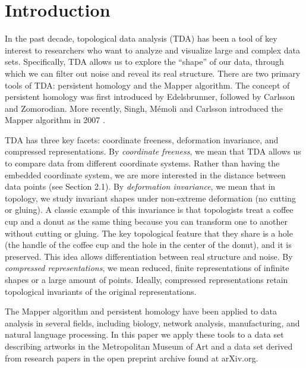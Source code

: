 \documentclass[12pt]{article}
\theoremstyle{definition}
\begin{document}
\section{Introduction}
In the past decade, topological data analysis (TDA) has been a tool of key interest to researchers who want to analyze and visualize large and complex data sets. Specifically, TDA allows us to explore the ``shape'' of our data, through which we can filter out noise and reveal its real structure. There are two primary tools of TDA: persistent homology and the Mapper algorithm. The concept of persistent homology was first introduced by Edelsbrunner\cite{Edelsbrunner2002}, followed by Carlsson and Zomorodian\cite{Zomorodian2005}. More recently, Singh, M\'emoli and Carlsson introduced the Mapper algorithm in 2007 \cite{originalmapper}.
\newline
\par TDA has three key facets: coordinate freeness, deformation invariance, and compressed representations\cite{lum2013extractinginsights}. By \textit{coordinate freeness}, we mean that TDA allows us to compare data from different coordinate systems. Rather than having the embedded coordinate system, we are more interested in the distance between data points (see Section 2.1). By \textit{deformation invariance}, we mean that in topology, we study invariant shapes under non-extreme deformation  (no cutting or gluing). A classic example of this invariance is that topologists treat a coffee cup and a donut as the same thing because you can transform one to another without cutting or gluing. The key topological feature that they share is a hole (the handle of the coffee cup and the hole in the center of the donut), and it is preserved. This idea allows differentiation between real structure and noise. By \textit{compressed representations}, we mean reduced, finite representations of infinite shapes or a large amount of points. Ideally, compressed representations retain topological invariants of the original representations. 
\newline
\par The Mapper algorithm\cite{originalmapper} and persistent homology\cite{Edelsbrunner2002}\cite{Zomorodian2005} have been applied to data analysis in several fields, including biology\cite{Nicolau7265}\cite{yao_sun_huang_bowman_singh_lesnick_guibas_pande_carlsson_2009}\cite{li_cheng_glicksberg_gottesman_tamler_chen_bottinger_dudley_2015}\cite{rizvi_camara_kandror_roberts_schieren_maniatis_rabadan_2017}\cite{nielson_paquette_2015}\cite{cámara_levine_rabadán_2016}\cite{kyeong_kim_kim_2017}\cite{rucco2014embolism}\cite{bendich_marron_miller_pieloch_skwerer_2016}, network analysis\cite{2013PLoSO...866506P}\cite{weights}\cite{Machacon_Herchel_Thaddeus2016}, manufacturing\cite{guo2017manu}, and natural language processing\cite{zhu2013language}. In this paper we apply these tools to a data set describing artworks in the Metropolitan Museum of Art\cite{metdata} and a data set derived from research papers in the open preprint archive found at arXiv.org\cite{arXivAPI}.
\end{document}
